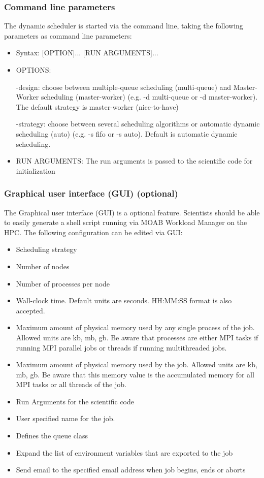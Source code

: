 	\subsubsection{Command line parameters}
		The dynamic scheduler is started via the command line, taking the following parameters as command line parameters:
	
		\begin{itemize}	
			\item Syntax: [OPTION]... [RUN ARGUMENTS]...
				
			\item OPTIONS:
							
				\subitem -design: choose between multiple-queue scheduling (multi-queue) and Master-Worker scheduling (master-worker) (e.g. -d multi-queue or -d master-worker). The default strategy is master-worker (nice-to-have)
				
				\subitem -strategy: choose between several scheduling algorithms or automatic dynamic scheduling (auto) (e.g. -s fifo or -s auto). Default is automatic dynamic scheduling.
					
			\item RUN ARGUMENTS:
				\subitem The run arguments is passed to the scientific code for initialization
		\end{itemize}
		
	\subsubsection{Graphical user interface (GUI) (optional)}
		The Graphical user interface (GUI) is a optional feature. Scientists should be able to easily generate a shell script running via MOAB Workload Manager on the HPC. The following configuration can be edited via GUI:
		
		\begin{itemize}
			\item Scheduling strategy
			\item Number of nodes
			\item Number of processes per node
			\item Wall-clock time. Default units are seconds. 
			HH:MM:SS format is also accepted.
			\item Maximum amount of physical memory used by any single process of the job. Allowed units are kb, mb, gb. Be aware that processes are either MPI tasks if running MPI parallel jobs or threads if running multithreaded jobs.
			\item Maximum amount of physical memory used by the job.
			Allowed units are kb, mb, gb. Be aware that this memory value is the accumulated memory for all MPI tasks or all threads of the job.
			\item Run Arguments for the scientific code
			\item User specified name for the job.
			\item Defines the queue class
			\item Expand the list of environment variables that are exported to the job
			\item Send email to the specified email address when job begins, ends or aborts
		\end{itemize}
	
	